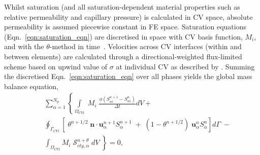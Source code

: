 \documentclass[preprint,authoryear,12pt]{elsarticle}
\newcommand{\PN}[2][error]{P$_{#1}$DG-P$_{#2}$}
\newcommand{\PNDG}[2][error]{P$_{#1}$DG-P$_{#2}$DG}
\begin{document}
\medskip
Whilst saturation (and all saturation-dependent material properties such as relative permeability and capillary pressure) is calculated in CV space, absolute permeability is assumed piecewise constant in FE space. Saturation equations (Eqn.~\ref{eqn:saturation_eqn}) are discretised in space with CV basis function, $M_{i}$, and with the $\theta$-method in time~\citep{gomes_book_2012}. Velocities across CV interfaces (within and between elements) are calculated through a directional-weighted flux-limited scheme based on upwind value of $\sigma$ at individual CV as described by \citet{jackson_2013}. Summing the discretised Eqn.~\ref{eqn:saturation_eqn} over all phases yields the global mass balance equation,
\begin{eqnarray}
 && \sum_{\alpha=1}^{N_{p}} \left\{\int\limits_{\Omega_{CVi}} \; M_{i} \; \frac{\phi\left(S_{\alpha i}^{n+1}-S_{\alpha i}^{n}\right)}{\Delta t} dV\right.  + \nonumber\\
 &&  \oint_{\Gamma_{CVi}} \left[\; \theta^{n+1/2}\; {\mathbf n}\cdot {\mathbf u}_{\alpha}^{n+1}S_{\alpha}^{n+1} \; + \; \left(1-\theta^{n+1/2}\right) \; {\mathbf u}_{\alpha}^{n}S_{\alpha}^{n}\right] d\Gamma \;- \nonumber\\
 &&  \left.\int_{\Omega_{CVi}} M_{i} \; \mathcal{S}_{cty,\alpha}^{n+\theta} \; dV\;\right\} =0,
\label{global_mass_balance}
\end{eqnarray}

\end{document}
